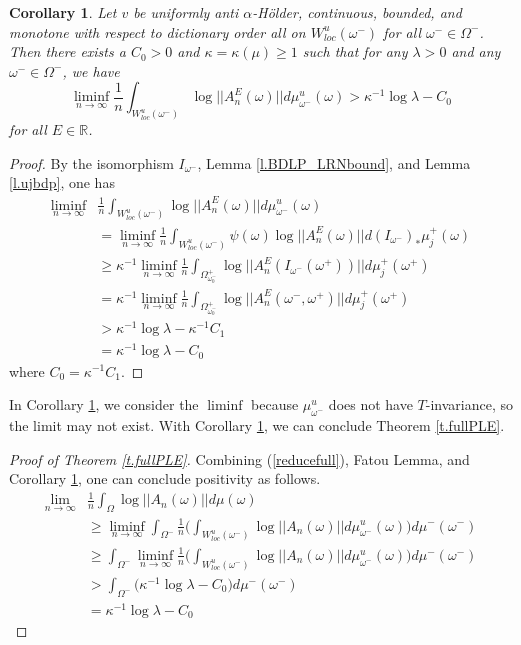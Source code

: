 \documentclass{amsart}
\newtheorem{corollary}{Corollary}
\newcommand{\RR}{\mathbb{R}}
\begin{document}
\begin{corollary}\label{c.plestable}
    Let $v$ be uniformly anti $\alpha$-H\"older, continuous, bounded, and monotone with respect to dictionary order all on $W^u_{loc}(\omega^-)$ for all $\omega^-\in \Omega^-$. Then there exists a $C_0 > 0$ and $\kappa = \kappa(\mu)\geq 1$ such that for any $\lambda>0$ and any $\omega^-\in \Omega^-$, we have
    \[\liminf_{n\rightarrow \infty} \frac{1}{n} \int_{W^u_{loc}(\omega^-)} \log||A^E_n(\omega)|| d\mu^u_{\omega^-}(\omega) > \kappa^{-1}\log \lambda - C_0\]
    for all $E\in \RR$.
\end{corollary}
\begin{proof}
    By the isomorphism $I_{\omega^-}$, Lemma \ref{l.BDLP_LRNbound}, and Lemma \ref{l.ujbdp}, one has
    \begin{align*}
        \liminf_{n\rightarrow \infty}& \frac{1}{n} \int_{W^u_{loc}(\omega^-)} \log||A^E_n(\omega)|| d\mu^u_{\omega^-}(\omega)\\
        &=  \liminf_{n\rightarrow \infty} \frac{1}{n} \int_{W^u_{loc}(\omega^-)} \psi(\omega)\log||A^E_n(\omega)|| d(I_{\omega^-})_*\mu^+_j(\omega) \\
        &\geq  \kappa^{-1} \liminf_{n\rightarrow \infty} \frac{1}{n} \int_{\Omega^+_{\omega^-_0}} \log||A^E_n(I_{\omega^-}(\omega^+))|| d\mu^+_j(\omega^+) \\
        &= \kappa^{-1} \liminf_{n\rightarrow \infty} \frac{1}{n} \int_{\Omega^+_{\omega^-_0}} \log||A^E_n(\omega^-,\omega^+)|| d\mu^+_j(\omega^+) \\
        &> \kappa^{-1}\log\lambda - \kappa^{-1} C_1\\
        &= \kappa^{-1}\log\lambda - C_0
    \end{align*}
    where $C_0 = \kappa^{-1}C_1$.
\end{proof}

In Corollary \ref{c.plestable}, we consider the $\liminf$ because $\mu^u_{\omega^-}$ does not have $T$-invariance, so the limit may not exist. With Corollary \ref{c.plestable}, we can conclude Theorem \ref{t.fullPLE}.

\begin{proof}[Proof of Theorem \ref{t.fullPLE}]
    Combining (\ref{reducefull}), Fatou Lemma, and Corollary \ref{c.plestable}, one can conclude positivity as follows.
    \begin{align*}
        \lim_{n\rightarrow \infty}& \frac{1}{n}\int_\Omega \log||A_n(\omega)||d\mu(\omega) \\
        &\geq \liminf_{n\rightarrow \infty} \int_{\Omega^-} \frac{1}{n}\Bigg(\int_{W^u_{loc}(\omega^-)}\log||A_n(\omega)||d\mu^u_{\omega^-}(\omega) \Bigg) d\mu^-(\omega^-)\\
        &\geq \int_{\Omega^-} \liminf_{n\rightarrow \infty} \frac{1}{n}\Bigg(\int_{W^u_{loc}(\omega^-)}\log||A_n(\omega)||d\mu^u_{\omega^-}(\omega) \Bigg) d\mu^-(\omega^-)\\
        &> \int_{\Omega^-} \Big(\kappa^{-1}\log\lambda - C_0\Big) d\mu^-(\omega^-)\\
        &= \kappa^{-1}\log\lambda - C_0
    \end{align*}
\end{proof}
\end{document}
